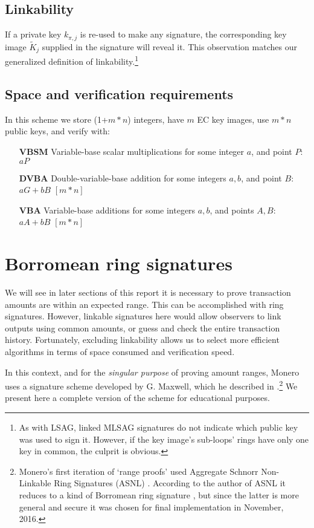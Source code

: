 \subsection*{Linkability}

If a private key \(k_{\pi, j}\) is re-used to make any signature, the corresponding key image \(\tilde{K}_j\) supplied in the signature will reveal it. This observation matches our generalized definition of linkability.\footnote{As with LSAG, linked MLSAG signatures do not indicate which public key was used to sign it. However, if the key image's sub-loops' rings have only one key in common, the culprit is obvious.}


\subsection*{Space and verification requirements}

In this scheme we store (1+$m*n$) integers, have $m$ EC key images, use $m*n$ public keys, and verify with:

\begin{itemize}
    \setlength\itemsep{\listspace}
    \item [\textbf{VBSM}] Variable-base scalar multiplications for some integer $a$, and point $P$: $a P$ \quad [m]
    \item [\textbf{DVBA}] Double-variable-base addition for some integers $a, b$, and point $B$: $a G + b B$ \quad \([m*n]\)
    \item [\textbf{VBA}] Variable-base additions for some integers $a, b$, and points $A, B$: $a A + b B$ \quad \([m*n]\)
\end{itemize}


\section{Borromean ring signatures}
\label{sec:borromean}

We will see in later sections of this report it is necessary to prove transaction amounts are within an expected range. This can be accomplished with ring signatures. However, linkable signatures here would allow observers to link outputs using common amounts, or guess and check the entire transaction history. Fortunately, excluding linkability allows us to select more efficient algorithms in terms of space consumed and verification speed.

In this context, and for the {\em singular purpose} of proving amount ranges, Monero uses a signature scheme developed by G. Maxwell, which he described in \cite{Signatures2015BorromeanRS}.\footnote{\label{asnl_note}Monero’s first iteration of `range proofs’ used Aggregate Schnorr Non-Linkable Ring Signatures (ASNL) \cite{MRL-0005}. According to the author of ASNL it reduces to a kind of Borromean ring signature \cite{ASNL-issue}, but since the latter is more general and secure it was chosen for final implementation in November, 2016.} We present here a complete version of the scheme for educational purposes.

